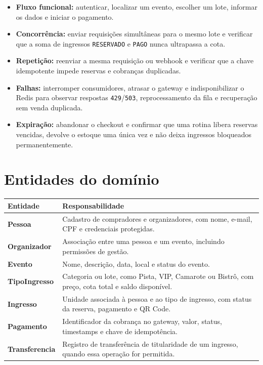 \documentclass[12pt,a4paper]{article}
\begin{document}
\begin{itemize}
  \item \textbf{Fluxo funcional:} autenticar, localizar um evento, escolher um lote, informar os dados e iniciar o pagamento.
  \item \textbf{Concorr\^encia:} enviar requisi\c{c}\~oes simult\^aneas para o mesmo lote e verificar que a soma de ingressos \texttt{RESERVADO} e \texttt{PAGO} nunca ultrapassa a cota.
  \item \textbf{Repeti\c{c}\~ao:} reenviar a mesma requisi\c{c}\~ao ou webhook e verificar que a chave idempotente impede reservas e cobran\c{c}as duplicadas.
  \item \textbf{Falhas:} interromper consumidores, atrasar o gateway e indisponibilizar o Redis para observar respostas \texttt{429}/\texttt{503}, reprocessamento da fila e recupera\c{c}\~ao sem venda duplicada.
  \item \textbf{Expira\c{c}\~ao:} abandonar o checkout e confirmar que uma rotina libera reservas vencidas, devolve o estoque uma \'unica vez e n\~ao deixa ingressos bloqueados permanentemente.
\end{itemize}

\section{Entidades do dom\'inio}

\begin{longtable}{>{\bfseries}p{3.2cm}p{10.1cm}}
\toprule
Entidade & Responsabilidade \\
\midrule
Pessoa & Cadastro de compradores e organizadores, com nome, e-mail, CPF e credenciais protegidas. \\
Organizador & Associa\c{c}\~ao entre uma pessoa e um evento, incluindo permiss\~oes de gest\~ao. \\
Evento & Nome, descri\c{c}\~ao, data, local e status do evento. \\
TipoIngresso & Categoria ou lote, como Pista, VIP, Camarote ou Bistr\^o, com pre\c{c}o, cota total e saldo dispon\'ivel. \\
Ingresso & Unidade associada \`a pessoa e ao tipo de ingresso, com status da reserva, pagamento e QR Code. \\
Pagamento & Identificador da cobran\c{c}a no gateway, valor, status, timestamps e chave de idempot\^encia. \\
Transferencia & Registro de transfer\^encia de titularidade de um ingresso, quando essa opera\c{c}\~ao for permitida. \\
\bottomrule
\end{longtable}
\end{document}
